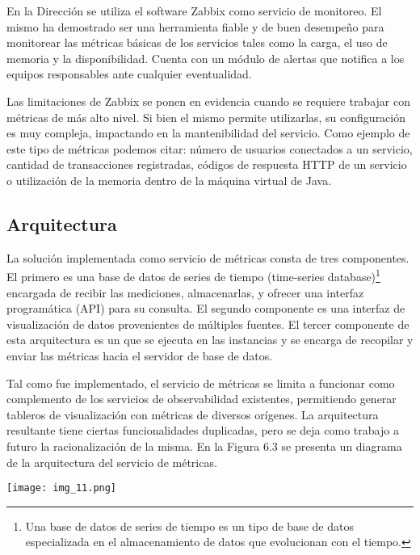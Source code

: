 En la Dirección se utiliza el software Zabbix como servicio de
monitoreo. El mismo ha demostrado ser una herramienta fiable y de buen
desempeño para monitorear las métricas básicas de los servicios tales
como la carga, el uso de memoria y la disponibilidad. Cuenta con un
módulo de alertas que notifica a los equipos responsables ante
cualquier eventualidad.

Las limitaciones de Zabbix se ponen en evidencia cuando se requiere
trabajar con métricas de más alto nivel. Si bien el mismo permite
utilizarlas, su configuración es muy compleja, impactando en la
mantenibilidad del servicio. Como ejemplo de este tipo de métricas
podemos citar: número de usuarios conectados a un servicio, cantidad
de transacciones registradas, códigos de respuesta HTTP de un servicio
o utilización de la memoria  dentro de la máquina virtual
de Java.

\subsection{Arquitectura}

La solución implementada como servicio de métricas consta de tres
componentes. El primero es una base de datos de series de tiempo
(time-series database)\footnote{ Una base de datos de series de tiempo
  es un tipo de base de datos especializada en el almacenamiento de
  datos que evolucionan con el tiempo. } encargada de recibir las
mediciones, almacenarlas, y ofrecer una interfaz programática (API)
para su consulta. El segundo componente es una interfaz de
visualización de datos provenientes de múltiples fuentes. El tercer
componente de esta arquitectura es un  que se ejecuta
en las instancias y se encarga de recopilar y enviar las métricas
hacia el servidor de base de datos.

Tal como fue implementado, el servicio de métricas se limita a
funcionar como complemento de los servicios de observabilidad
existentes, permitiendo generar tableros de visualización con métricas
de diversos orígenes. La arquitectura resultante tiene ciertas
funcionalidades duplicadas, pero se deja como trabajo a futuro la
racionalización de la misma. En la Figura 6.3 se presenta un diagrama
de la arquitectura del servicio de métricas.

\texttt{[image: img\_11.png]}


